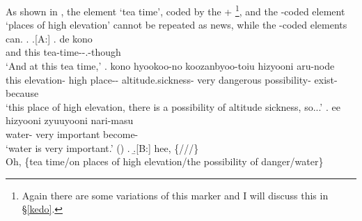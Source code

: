%
As shown in \Next,
the element  `tea time', coded by the  + %
	\footnote{
	Again there are some variations of this marker
	and I will discuss this in \S \ref{kedo}.
	}, and the -coded element  `places of high elevation'
cannot be repeated as news,
while the -coded elements can.
%
\ex. \a.[A:] \ag. de kono  \\
		and this tea-time--.-though \\
		`And at this tea time,'
	\bg. kono hyookoo-no   koozanbyoo-toiu hizyooni   aru-node \\
		this elevation- high place-- altitude.sickness- very dangerous possibility- exist-because \\
		`this place of high elevation, there is a possibility of altitude sickness, so...'
	\bg. ee  hizyooni zyuuyooni nari-masu \\
		 water- very important become- \\
		`water is very important.'
		 \hfill{()}
	\z.
\b.[B:] hee, \{///\} \\
	Oh, \{tea time/on places of high elevation/the possibility of danger/water\}


%
%
%
%


